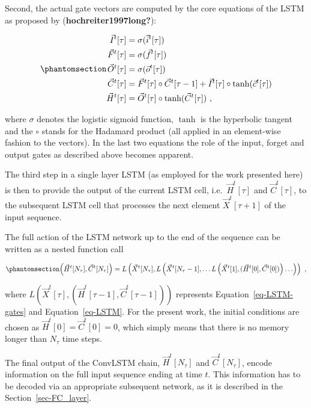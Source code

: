 \documentclass[
]{agujournal2019}
\begin{document}
Second, the actual gate vectors are computed by the core equations of
the LSTM as proposed by (\textbf{hochreiter1997long?}):

\begin{equation}\phantomsection\label{eq-LSTM}{
\begin{aligned}
\vec{I}^t[\tau] &= \sigma(\vec{i}^t[\tau]) \\
\vec{F}^t[\tau] &= \sigma(\vec{f}^t[\tau]) \\
\vec{O}^t[\tau] &= \sigma(\vec{o}^t[\tau]) \\
\vec{C}^t[\tau] &= \vec{F}^t[\tau] \circ \vec{C}^t[\tau-1]  + \vec{I}^t[\tau] \circ \tanh(\vec{c}^t[\tau]) \\
\vec{H}^t[\tau]  &= \vec{O}^t[\tau] \circ \tanh(\vec{C}^t[\tau]) \ ,
\end{aligned}
}\end{equation}

where \(\sigma\) denotes the logistic sigmoid function, \(\tanh\) is the
hyperbolic tangent and the \(\circ\) stands for the Hadamard product
(all applied in an element-wise fashion to the vectors). In the last two
equations the role of the input, forget and output gates as described
above becomes apparent.

The third step in a single layer LSTM (as employed for the work
presented here) is then to provide the output of the current LSTM cell,
i.e.~\(\vec{H}^t[\tau]\) and \(\vec{C}^t[\tau]\), to the subsequent LSTM
cell that processes the next element \(\vec{X}^t[\tau+1]\) of the input
sequence.

The full action of the LSTM network up to the end of the sequence can be
written as a nested function call

\begin{equation}\phantomsection\label{eq-L_nested}{
\left(\vec{H}^t[N_\tau], \vec{C}^t[N_\tau] \right) = L \left( \vec{X}^t[N_\tau], L \left( \vec{X}^t[N_\tau-1], \ldots L \left( \vec{X}^t[1], (\vec{H}^t[0], \vec{C}^t[0]) \right) \ldots \right) \right) \ ,
}\end{equation}

where
\(L\left(\vec{X}^t[\tau], \left(\vec{H}^t[\tau-1], \vec{C}^t[\tau-1] \right) \right)\)
represents Equation~\ref{eq-LSTM-gates} and Equation~\ref{eq-LSTM}. For
the present work, the initial conditions are chosen as
\(\vec{H}^t[0]=\vec{C}^t[0]=0\), which simply means that there is no
memory longer than \(N_\tau\) time steps.

The final output of the ConvLSTM chain, \(\vec{H}^t[N_\tau]\) and
\(\vec{C}^t[N_\tau]\), encode information on the full input sequence
ending at time \(t\). This information has to be decoded via an
appropriate subsequent network, as it is described in the
Section~\ref{sec-FC_layer}.
\end{document}
